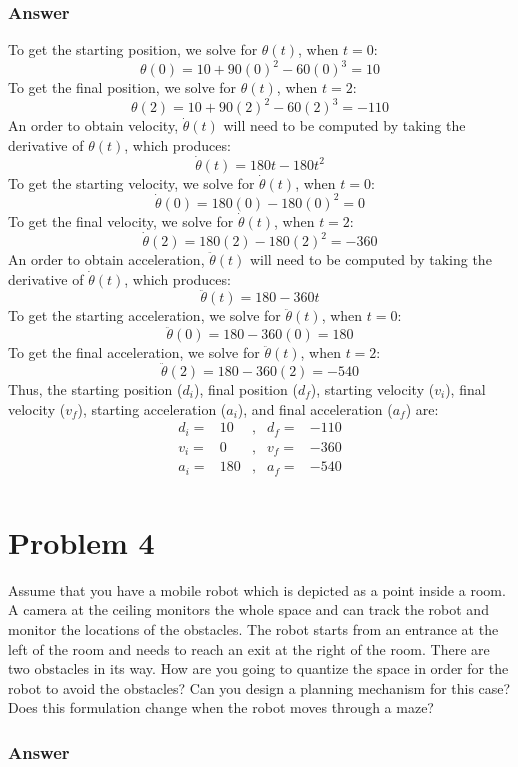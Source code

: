 \documentclass[10pt]{article}
\begin{document}
\subsubsection*{Answer}
To get the starting position, we solve for \(\theta(t)\), when \(t = 0\):
\[\theta(0) = 10 + 90(0)^2 - 60(0)^3 = 10\]
To get the final position, we solve for \(\theta(t)\), when \(t = 2\):
\[\theta(2) = 10 + 90(2)^2 - 60(2)^3 = -110\]
An order to obtain velocity, \(\dot{\theta}(t)\) will need to be computed by taking the derivative of \(\theta(t)\), which produces:
\[\dot{\theta}(t) = 180t - 180t^2\]
To get the starting velocity, we solve for \(\dot{\theta}(t)\), when \(t = 0\):
\[\dot{\theta}(0) = 180(0) - 180(0)^2 = 0\]
To get the final velocity, we solve for \(\dot{\theta}(t)\), when \(t = 2\):
\[\dot{\theta}(2) = 180(2) - 180(2)^2 = -360\]
An order to obtain acceleration, \(\ddot{\theta}(t)\) will need to be computed by taking the derivative of \(\dot{\theta}(t)\), which produces:
\[\ddot{\theta}(t) = 180 - 360t\]
To get the starting acceleration, we solve for \(\ddot{\theta}(t)\), when \(t = 0\):
\[\ddot{\theta}(0) = 180 - 360(0) = 180\]
To get the final acceleration, we solve for \(\ddot{\theta}(t)\), when \(t = 2\):
\[\ddot{\theta}(2) = 180 - 360(2) = -540\]
Thus, the starting position (\(d_i\)), final position (\(d_f\)), starting velocity (\(v_i\)), final velocity (\(v_f\)), starting acceleration (\(a_i\)), and final acceleration (\(a_f\)) are:
\[
\begin{array}{lrllr}
    d_i = &10 &,& d_f = &-110  \\
    v_i = &0  &,& v_f = &-360  \\
    a_i = &180 &,& a_f = &-540 \\
\end{array}
\]
\pagebreak
\section*{Problem 4}
Assume that you have a mobile robot which is depicted as a point inside a room. A camera at the ceiling monitors the whole space and can track the robot and monitor the locations of the obstacles. The robot starts from an entrance at the left of the room and needs to reach an exit at the right of the room. There are two obstacles in its way. How are you going to quantize the space in order for the robot to avoid the obstacles? Can you design a planning mechanism for this case? Does this formulation change when the robot moves through a maze?
\subsubsection*{Answer}
\pagebreak


\end{document}
